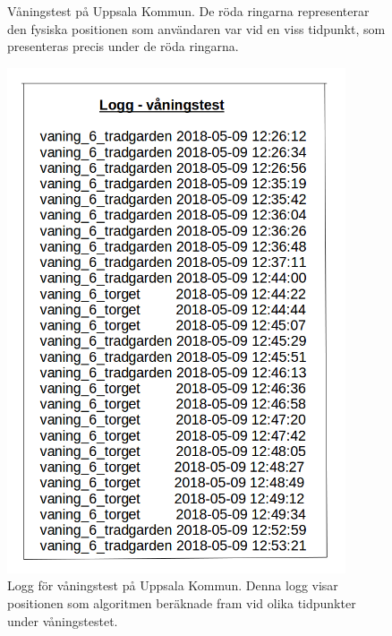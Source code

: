 \documentclass[a4paper,12pt]{article}
\begin{document}
 \begin{figure}[H]
   \centering
   \caption{Våningstest på Uppsala Kommun. De röda ringarna representerar den fysiska positionen som användaren var vid en viss tidpunkt, som presenteras precis under de röda ringarna.}
   \label{fig:vanings_test}
 \end{figure}

 \begin{figure}[H]
   \centering
   \includegraphics[width=10cm]{media/logg_vaningstest.png}
   \caption{Logg för våningstest på Uppsala Kommun. Denna logg visar positionen som algoritmen beräknade fram vid olika tidpunkter under våningstestet.}
   \label{fig:logg_vaningstest}
 \end{figure}
\end{document}
